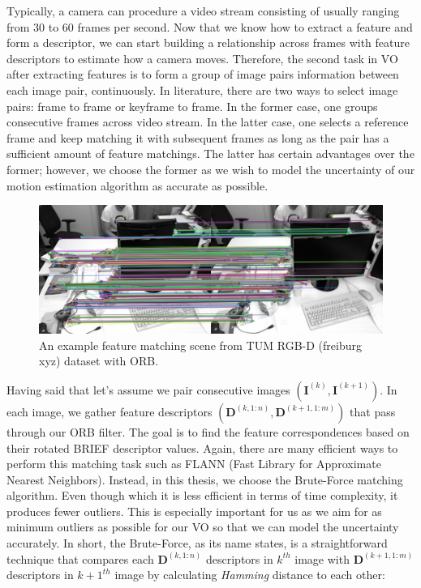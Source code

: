 \documentclass[a4paper]{report}
\numberwithin{figure}{section}
\begin{document}
Typically, a camera can procedure a video stream consisting of 
usually ranging from 30 to 60 frames per second. 
Now that we know how to extract a feature and form a descriptor, 
we can start building a relationship across frames with feature descriptors to 
estimate how a camera 
moves. 
Therefore, the second task in VO after 
extracting features is to form a group of image pairs information between each 
image pair, continuously. In literature, there are two ways to select image 
pairs: frame to frame or keyframe to frame. In the former case, one groups 
consecutive frames across video stream. In the latter case, one selects a 
reference frame and keep matching it with subsequent frames as long as the 
pair has a sufficient amount of feature matchings. The latter has certain 
advantages over the former; however, we choose the former as we wish to model 
the uncertainty of our motion estimation algorithm as accurate as possible. 

\begin{figure}[H]
	\centering
	\includegraphics[width=\linewidth,natwidth=640,natheight=640]
	{fig/ref_imgs/covo_matches.png}
	\caption[ORB Feature Mathces]
	{An example feature matching scene from 
	TUM RGB-D (freiburg xyz) dataset with ORB.}
	\label{fig:feature_matchings}
\end{figure}

Having said that let's assume we pair consecutive images $(\mathbf{I}^{(k)}, 
\mathbf{I}^{(k+1)})$. In each image, we gather feature descriptors 
$(\mathbf{D}^{(k,1:n)}, \mathbf{D}^{(k+1,1:m)})$ that pass through our ORB 
filter. The goal is to find the feature correspondences based on their rotated 
BRIEF descriptor values. Again, there are many efficient ways to perform this 
matching task such as FLANN (Fast Library for Approximate Nearest Neighbors). 
Instead, in this thesis, we choose the Brute-Force matching algorithm.
Even though which it is less efficient in terms of time complexity, it 
produces fewer outliers. This is especially important for us as we aim for as 
minimum outliers as possible for our VO so that we can model the uncertainty 
accurately. 
In short, the Brute-Force, as its name states, is a straightforward technique 
that 
compares each $\mathbf{D}^{(k,1:n)}$ descriptors in $k^{th}$ image with 
$\mathbf{D}^{(k+1,1:m)}$ descriptors in $k+1^{th}$ image by calculating 
\textit{Hamming} distance to each other:
\end{document}
